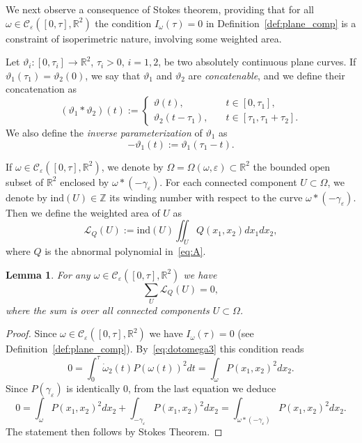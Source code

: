 \documentclass[12pt]{amsart}
\theoremstyle{plain}
\newtheorem {lemma}[theorem]{Lemma}
\theoremstyle{definition}
\theoremstyle{remark}
\numberwithin{equation}{section}
\newcommand{\R}{\mathbb{R}}
\newcommand{\<}{\langle}
\renewcommand{\>}{\rangle}
\newcommand{\e}{\varepsilon}
\newcommand{\0}{\theta}
\newcommand{\w}{\omega}
\newcommand{\g}{\gamma}
\newcommand{\1}{{-1}}
\renewcommand{\=}{\coloneqq}
\renewcommand{\.}{\dots}
\renewcommand{\-}{\cdot}
\renewcommand{\:}{\,:\,}
\newcommand{\mc}{\mathcal}
\theoremstyle{definition}
\begin{document}
\medskip


\newcommand{\ind}{{\mathrm{ind}}}


We next observe a consequence of Stokes theorem, providing that for all $\w\in \mc C_\e([0,\tau],\R^2)$ the condition $I_\w(\tau)=0$ in Definition~\ref{def:plane_comp} is a constraint of isoperimetric nature, involving some weighted area.

Let $\vartheta_i:[0,\tau_i]\to\R^2$, $\tau_i>0$, $i=1,2$, be two absolutely continuous plane curves. If $\vartheta_1(\tau_1)=\vartheta_2(0)$, we say that $\vartheta_1$ and $\vartheta_2$ are {\em concatenable}, and we define their concatenation as
\begin{equation}
	(\vartheta_1*\vartheta_2)(t):=
	\begin{cases}
		\vartheta(t), \quad &t\in[0,\tau_1],\\
		\vartheta_2(t-\tau_1), \quad &t\in[\tau_1,\tau_1+\tau_2].
	\end{cases} 
\end{equation}
We also define the {\em inverse parameterization} of $\vartheta_1$ as
\begin{equation}
	-\vartheta_1(t):=\vartheta_1(\tau_1-t).
\end{equation}


If $\w\in \mc C_\e([0,\tau],\R^2)$, we denote by $\Omega=\Omega(\w,\e)  \subset \mathbb R^2$ the bounded open subset of $\mathbb R^2$ enclosed
by $\w*(-\g_\e)$. For each connected component $U\subset \Omega$, we denote by $\mathrm{ind}(U)\in\mathbb Z$ its winding number with respect to the 
curve $\w*(-\g_\e)$. Then we define the weighted area of $U$ as 
\begin{equation}
	\label{eq:areapesata}
	\mathscr L_Q(U):=\ind(U)\iint_U Q(x_1,x_2)dx_1dx_2,
\end{equation}
where $Q$ is the abnormal polynomial in~\eqref{eq:A}.



\begin{lemma}
	\label{lem:Stokes}
	For any $\omega \in \mathcal C_\e([0,\tau],\mathbb R^2)$ we have 
	\begin{equation}
		\label{eq:Stokes}
		\sum_{U} \mathscr L_Q(U)=0,
	\end{equation} 
	where the sum is over all connected components $U\subset\Omega$.
\end{lemma}

\begin{proof}
	Since $\w\in \mc C_\e([0,\tau],\mathbb R^2)$ we have $I_\w(\tau)=0$ (see Definition~\ref{def:plane_comp}). By~\eqref{eq:dotomega3} this condition reads
	\begin{equation}
		0=\int_0^\tau \dot\w_2(t) P(\w(t))^2dt=\int_{\w}P(x_1,x_2)^2dx_2.
	\end{equation}
	Since $P(\g_\e)$ is identically 0, from the last equation we deduce 
	\begin{equation}
		0=\int_{\w}P(x_1,x_2)^2dx_2+\int_{-\g_\e}P(x_1,x_2)^2dx_2=\int_{\w*(-\g_\e)}P(x_1,x_2)^2dx_2.
	\end{equation}
	The statement then follows by Stokes Theorem.
\end{proof}
\end{document}
